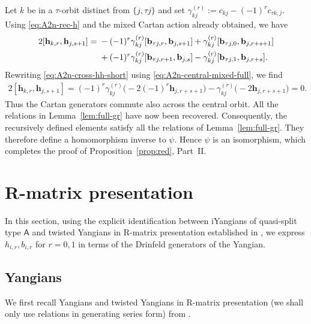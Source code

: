 \documentclass[11pt,reqno]{amsart}
\numberwithin{equation}{section}
\theoremstyle{definition}
\theoremstyle{remark}
\newcommand{\bb}{\mathbf{b}}
\newcommand{\bh}{\mathbf{h}}
\begin{document}
Let $k$ be in a $\tau$-orbit distinct from
$\{j,\tau j\}$ and set $\gamma_{kj}^{(r)}
:=
c_{kj}-(-1)^r c_{\tau k,j}$.
Using \eqref{eq:A2n-rec-h} and the mixed Cartan action already
obtained, we have
\begin{align}
2[\bh_{k,r},\bh_{j,s+1}]
={}&
-(-1)^r \gamma_{kj}^{(r)}
[\bb_{\tau j,r},\bb_{j,s+1}]
+
\gamma_{kj}^{(r)}
[\bb_{\tau j,0},\bb_{j,r+s+1}]
\notag\\
&+
(-1)^r \gamma_{kj}^{(r)}
[\bb_{\tau j,r+1},\bb_{j,s}]
-
\gamma_{kj}^{(r)}
[\bb_{\tau j,1},\bb_{j,r+s}].
\label{eq:A2n-cross-hh-short}
\end{align}
Rewriting
\eqref{eq:A2n-cross-hh-short} using \eqref{eq:A2n-central-mixed-full}, we find
\begin{align*}
2[\bh_{k,r},\bh_{j,s+1}]
=
(-1)^r \gamma_{kj}^{(r)}
\bigl(-2(-1)^r\bh_{j,r+s+1}\bigr)
-
\gamma_{kj}^{(r)}
\bigl(-2\bh_{j,r+s+1}\bigr)
=0.
\end{align*}
Thus the Cartan generators commute also across the central orbit.
All the relations in Lemma~\ref{lem:full-gr} have now been
recovered. Consequently, the recursively defined elements satisfy all the
relations of Lemma~\ref{lem:full-gr}. They therefore define a
homomorphism inverse to \(\psi\). Hence \(\psi\) is an isomorphism,
which completes the proof of Proposition~\ref{prop:red}, Part~II.


\section{R-matrix presentation}\label{sec:app+}

In this section, using the explicit identification between iYangians of quasi-split type $\mathsf A$ and twisted Yangians in R-matrix presentation established in \cite{LZ24}, we express $h_{i,r},b_{i,r}$ for $r=0,1$ in terms of the Drinfeld generators of the Yangian.

\subsection{Yangians}\label{sec:Y-R}
We first recall Yangians and twisted Yangians in R-matrix presentation (we shall only use relations in generating series form) from \cite{MNO96,MR02,LZ24}.
\end{document}
